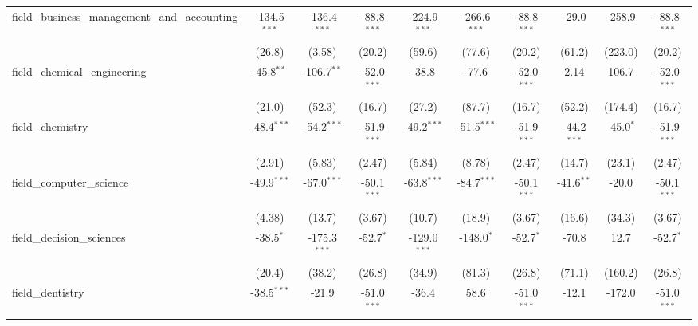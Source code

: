 \begin{tabular}{lccccccccc}
   field\_business\_management\_and\_accounting                & -134.5$^{***}$ & -136.4$^{***}$ & -88.8$^{***}$ & -224.9$^{***}$ & -266.6$^{***}$ & -88.8$^{***}$ & -29.0          & -258.9         & -88.8$^{***}$\\   
                                                               & (26.8)         & (3.58)         & (20.2)        & (59.6)         & (77.6)         & (20.2)        & (61.2)         & (223.0)        & (20.2)\\   
   field\_chemical\_engineering                                & -45.8$^{**}$   & -106.7$^{**}$  & -52.0$^{***}$ & -38.8          & -77.6          & -52.0$^{***}$ & 2.14           & 106.7          & -52.0$^{***}$\\   
                                                               & (21.0)         & (52.3)         & (16.7)        & (27.2)         & (87.7)         & (16.7)        & (52.2)         & (174.4)        & (16.7)\\   
   field\_chemistry                                            & -48.4$^{***}$  & -54.2$^{***}$  & -51.9$^{***}$ & -49.2$^{***}$  & -51.5$^{***}$  & -51.9$^{***}$ & -44.2$^{***}$  & -45.0$^{*}$    & -51.9$^{***}$\\   
                                                               & (2.91)         & (5.83)         & (2.47)        & (5.84)         & (8.78)         & (2.47)        & (14.7)         & (23.1)         & (2.47)\\   
   field\_computer\_science                                    & -49.9$^{***}$  & -67.0$^{***}$  & -50.1$^{***}$ & -63.8$^{***}$  & -84.7$^{***}$  & -50.1$^{***}$ & -41.6$^{**}$   & -20.0          & -50.1$^{***}$\\   
                                                               & (4.38)         & (13.7)         & (3.67)        & (10.7)         & (18.9)         & (3.67)        & (16.6)         & (34.3)         & (3.67)\\   
   field\_decision\_sciences                                   & -38.5$^{*}$    & -175.3$^{***}$ & -52.7$^{*}$   & -129.0$^{***}$ & -148.0$^{*}$   & -52.7$^{*}$   & -70.8          & 12.7           & -52.7$^{*}$\\   
                                                               & (20.4)         & (38.2)         & (26.8)        & (34.9)         & (81.3)         & (26.8)        & (71.1)         & (160.2)        & (26.8)\\   
   field\_dentistry                                            & -38.5$^{***}$  & -21.9          & -51.0$^{***}$ & -36.4          & 58.6           & -51.0$^{***}$ & -12.1          & -172.0         & -51.0$^{***}$\\   

\end{tabular}
